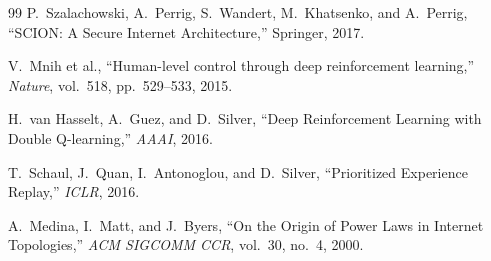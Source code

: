 \documentclass[11pt,a4paper,twoside,openright]{report}
\begin{document}
\begin{thebibliography}{99}
P.~Szalachowski, A.~Perrig, S.~Wandert, M.~Khatsenko, and A.~Perrig,
``SCION: A Secure Internet Architecture,'' Springer, 2017.

V.~Mnih et al.,
``Human-level control through deep reinforcement learning,''
\textit{Nature}, vol.~518, pp.~529--533, 2015.

H.~van Hasselt, A.~Guez, and D.~Silver,
``Deep Reinforcement Learning with Double Q-learning,''
\textit{AAAI}, 2016.

T.~Schaul, J.~Quan, I.~Antonoglou, and D.~Silver,
``Prioritized Experience Replay,''
\textit{ICLR}, 2016.

A.~Medina, I.~Matt, and J.~Byers,
``On the Origin of Power Laws in Internet Topologies,''
\textit{ACM SIGCOMM CCR}, vol.~30, no.~4, 2000.
\end{thebibliography}
\end{document}
